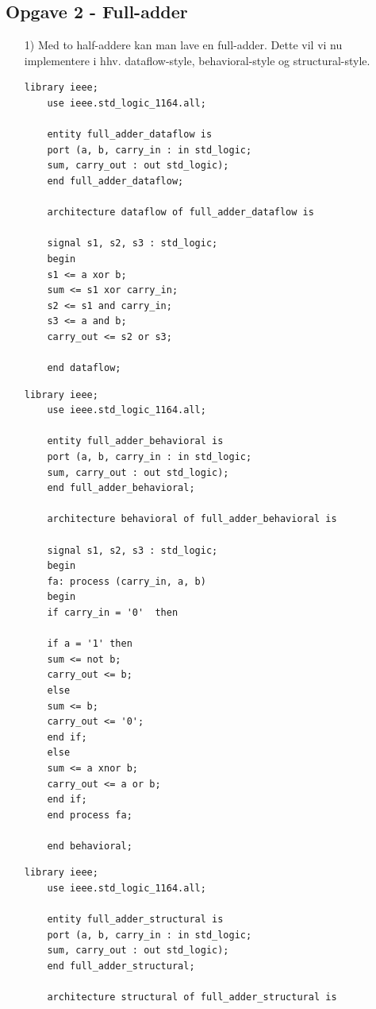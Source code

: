 \subsection{Opgave 2 - Full-adder}
	\flushleft
\begin{enumerate}
	\item[1)]
	Med to half-addere kan man lave en full-adder. Dette vil vi nu implementere i hhv. dataflow-style, behavioral-style og structural-style.\\
	\medskip
	\begin{lstlisting}[caption={Full-adder Dataflow VHDL kode},label={lst:FaDataflowCode}]
	library ieee;
	use ieee.std_logic_1164.all;
	
	entity full_adder_dataflow is
	port (a, b, carry_in : in std_logic;
	sum, carry_out : out std_logic);
	end full_adder_dataflow;
	
	architecture dataflow of full_adder_dataflow is
	
	signal s1, s2, s3 : std_logic;
	begin
	s1 <= a xor b; 
	sum <= s1 xor carry_in;
	s2 <= s1 and carry_in;
	s3 <= a and b;
	carry_out <= s2 or s3;
	
	end dataflow;
	\end{lstlisting}
	\medskip
	\begin{lstlisting}[caption={Full-adder Behavioral VHDL kode}, label={lst:FaBehavioralCode}]
	library ieee;
	use ieee.std_logic_1164.all;
	
	entity full_adder_behavioral is
	port (a, b, carry_in : in std_logic;
	sum, carry_out : out std_logic);
	end full_adder_behavioral;
	
	architecture behavioral of full_adder_behavioral is
	
	signal s1, s2, s3 : std_logic;
	begin
	fa: process (carry_in, a, b)
	begin
	if carry_in = '0'  then
	
	if a = '1' then
	sum <= not b;
	carry_out <= b;
	else
	sum <= b;
	carry_out <= '0';
	end if;
	else 
	sum <= a xnor b;
	carry_out <= a or b;
	end if;
	end process fa;
	
	end behavioral;
	\end{lstlisting}
	\medskip
	\begin{lstlisting}[caption={Full-adder Structural VHDL kode},label={lst:FaStructuralCode}]
	library ieee;
	use ieee.std_logic_1164.all;
	
	entity full_adder_structural is
	port (a, b, carry_in : in std_logic;
	sum, carry_out : out std_logic);
	end full_adder_structural;
	
	architecture structural of full_adder_structural is
	

\end{lstlisting}
\end{enumerate}
